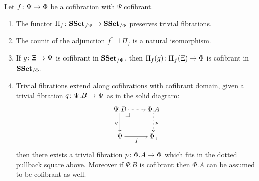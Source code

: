 \documentclass[reqno,10pt,a4paper,oneside,draft]{amsart}
\begin{document}
\begin{lemma}\label{Lemma:ForTheExtProperty} Let $f \colon \Psi \rightarrow \Phi$ be a cofibration with $\Psi$ cofibrant. 
\begin{enumerate}[$(i)$]
\item The functor $\Pi_f \colon \mathbf{SSet}_{/\Psi} \rightarrow \mathbf{SSet}_{/\Phi}$ preserves trivial fibrations.
\item The counit of the adjunction $f^* \dashv \Pi_f$ is a natural isomorphism.
\item If $g \colon \Xi \to \Psi$  is cofibrant in $\mathbf{SSet}_{/\Psi}$, then $\Pi_f(g) \colon \Pi_f(\Xi) \to \Phi$  is cofibrant in~$\mathbf{SSet}_{/\Phi}$.
\item Trivial fibrations extend along cofibrations with cofibrant domain, \ie given a trivial fibration $q
 \colon \Psi.B \to \Psi$  as in the solid diagram:
\[
\xymatrix{
\Psi.B \ar@{.>}[r] \ar[d]_{q} \drpullback  & \Phi.A \ar@{.>}[d]^{p} \\
\Psi \ar[r]_f &  \Phi \, ,}
\]
then there exists a trivial fibration $p \colon \Phi.A \rightarrow \Phi$ which fits in the dotted pullback square above. Moreover if $\Psi.B$ is cofibrant  then 
$\Phi.A$ can be assumed to be 
cofibrant as well.
\end{enumerate}
\end{lemma}
\end{document}
